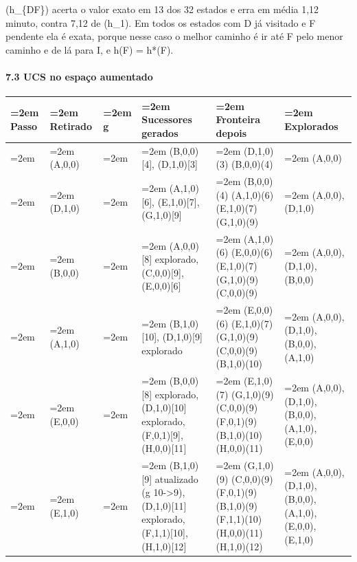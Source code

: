 \documentclass[12pt, a4paper]{article}
\begin{document}
(h\_\{DF\}) acerta o valor exato em 13 dos 32 estados e erra em média 1,12 minuto, contra 7,12 de (h\_1). Em todos os estados com D já visitado e F pendente ela é exata, porque nesse caso o melhor caminho é ir até F pelo menor caminho e de lá para I, e h(F) = h*(F).

\paragraph{7.3 UCS no espaço aumentado}\label{73-ucs-no-espauxe7o-aumentado}

\begingroup
\setlength{\tabcolsep}{3.0pt}
\begin{longtable}{@{}>{\small \raggedright\hyphenpenalty=30\tolerance=999\emergencystretch=2em\arraybackslash}p{0.95cm}>{\small \raggedright\hyphenpenalty=30\tolerance=999\emergencystretch=2em\arraybackslash}p{1.50cm}>{\small \raggedright\hyphenpenalty=30\tolerance=999\emergencystretch=2em\arraybackslash}p{0.87cm}>{\small \raggedright\hyphenpenalty=30\tolerance=999\emergencystretch=2em\arraybackslash}p{3.40cm}>{\small \raggedright\hyphenpenalty=30\tolerance=999\emergencystretch=2em\arraybackslash}p{3.69cm}>{\small \raggedright\hyphenpenalty=30\tolerance=999\emergencystretch=2em\arraybackslash}p{3.82cm}@{}}
\toprule\noalign{}
Passo & Retirado & g & Sucessores gerados & Fronteira depois & Explorados \\
\midrule\noalign{}
\endhead
\bottomrule\noalign{}
\endlastfoot
1 & (A,0,0) & 0 & (B,0,0){[}4{]}, (D,1,0){[}3{]} & (D,1,0)(3) (B,0,0)(4) & (A,0,0) \\
2 & (D,1,0) & 3 & (A,1,0){[}6{]}, (E,1,0){[}7{]}, (G,1,0){[}9{]} & (B,0,0)(4) (A,1,0)(6) (E,1,0)(7) (G,1,0)(9) & (A,0,0), (D,1,0) \\
3 & (B,0,0) & 4 & (A,0,0){[}8{]} explorado, (C,0,0){[}9{]}, (E,0,0){[}6{]} & (A,1,0)(6) (E,0,0)(6) (E,1,0)(7) (G,1,0)(9) (C,0,0)(9) & (A,0,0), (D,1,0), (B,0,0) \\
4 & (A,1,0) & 6 & (B,1,0){[}10{]}, (D,1,0){[}9{]} explorado & (E,0,0)(6) (E,1,0)(7) (G,1,0)(9) (C,0,0)(9) (B,1,0)(10) & (A,0,0), (D,1,0), (B,0,0), (A,1,0) \\
5 & (E,0,0) & 6 & (B,0,0){[}8{]} explorado, (D,1,0){[}10{]} explorado, (F,0,1){[}9{]}, (H,0,0){[}11{]} & (E,1,0)(7) (G,1,0)(9) (C,0,0)(9) (F,0,1)(9) (B,1,0)(10) (H,0,0)(11) & (A,0,0), (D,1,0), (B,0,0), (A,1,0), (E,0,0) \\
6 & (E,1,0) & 7 & (B,1,0){[}9{]} atualizado (g 10->9), (D,1,0){[}11{]} explorado, (F,1,1){[}10{]}, (H,1,0){[}12{]} & (G,1,0)(9) (C,0,0)(9) (F,0,1)(9) (B,1,0)(9) (F,1,1)(10) (H,0,0)(11) (H,1,0)(12) & (A,0,0), (D,1,0), (B,0,0), (A,1,0), (E,0,0), (E,1,0) \\

\end{longtable}
\end{document}
